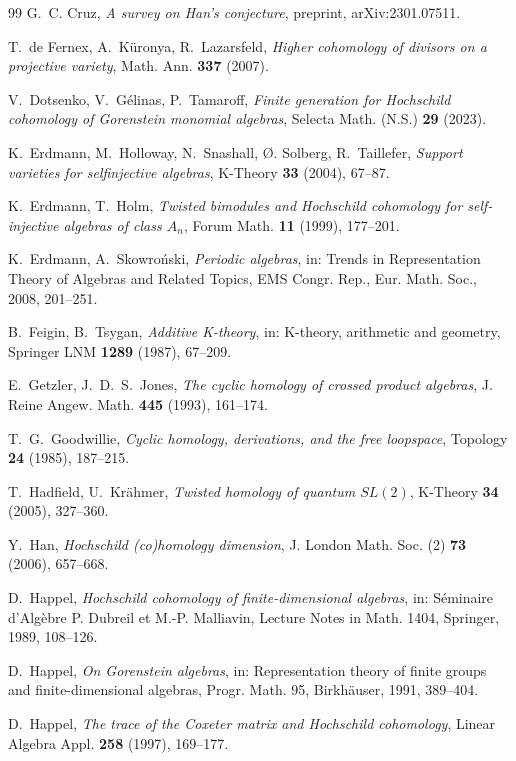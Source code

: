 \documentclass[11pt]{amsart}
\theoremstyle{definition}
\begin{document}
\begin{thebibliography}{99}
 G.~C. Cruz, \emph{A survey on Han's conjecture}, preprint,
arXiv:2301.07511.

 T.~de Fernex, A.~K\"uronya, R.~Lazarsfeld, \emph{Higher
cohomology of divisors on a projective variety}, Math. Ann. \textbf{337}
(2007).

 V.~Dotsenko, V.~G\'elinas, P.~Tamaroff, \emph{Finite generation
for Hochschild cohomology of Gorenstein monomial algebras}, Selecta Math.
(N.S.) \textbf{29} (2023).

 K.~Erdmann, M.~Holloway, N.~Snashall, \O. Solberg,
R.~Taillefer, \emph{Support varieties for selfinjective algebras}, K-Theory
\textbf{33} (2004), 67--87.

 K.~Erdmann, T.~Holm, \emph{Twisted bimodules and
Hochschild cohomology for self-injective algebras of class $A_n$}, Forum Math.
\textbf{11} (1999), 177--201.

 K.~Erdmann, A.~Skowro\'nski, \emph{Periodic
algebras}, in: Trends in Representation Theory of Algebras and Related
Topics, EMS Congr. Rep., Eur. Math. Soc., 2008, 201--251.

 B.~Feigin, B.~Tsygan, \emph{Additive K-theory}, in:
K-theory, arithmetic and geometry, Springer LNM \textbf{1289} (1987), 67--209.

 E.~Getzler, J.~D.~S.~Jones, \emph{The cyclic homology of
crossed product algebras}, J. Reine Angew. Math. \textbf{445} (1993), 161--174.

 T.~G.~Goodwillie, \emph{Cyclic homology, derivations, and
the free loopspace}, Topology \textbf{24} (1985), 187--215.

 T.~Hadfield, U.~Kr\"ahmer, \emph{Twisted homology of quantum
$SL(2)$}, K-Theory \textbf{34} (2005), 327--360.

 Y.~Han, \emph{Hochschild (co)homology dimension}, J. London
Math. Soc. (2) \textbf{73} (2006), 657--668.

 D.~Happel, \emph{Hochschild cohomology of
finite-dimensional algebras}, in: S\'eminaire d'Alg\`ebre P. Dubreil et M.-P.
Malliavin, Lecture Notes in Math. 1404, Springer, 1989, 108--126.

 D.~Happel, \emph{On Gorenstein algebras}, in:
Representation theory of finite groups and finite-dimensional algebras,
Progr. Math. 95, Birkh\"auser, 1991, 389--404.

 D.~Happel, \emph{The trace of the Coxeter matrix and
Hochschild cohomology}, Linear Algebra Appl. \textbf{258} (1997), 169--177.


\end{thebibliography}
\end{document}
